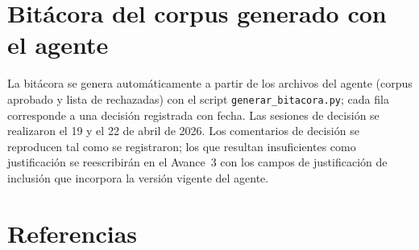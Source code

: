 \documentclass[letter,12pt]{article}
\begin{document}
\section{Bitácora del corpus generado con el agente}\label{anx:bitacora}

La bitácora se genera automáticamente a partir de los archivos del agente (corpus aprobado y lista de rechazadas) con el script \texttt{generar\_bitacora.py}; cada fila corresponde a una decisión registrada con fecha. Las sesiones de decisión se realizaron el 19 y el 22 de abril de 2026. Los comentarios de decisión se reproducen tal como se registraron; los que resultan insuficientes como justificación se reescribirán en el Avance~3 con los campos de justificación de inclusión que incorpora la versión vigente del agente.



\clearpage
\renewcommand{\thesection}{\arabic{section}}
\section*{Referencias}
\renewcommand{\refname}{}
\vspace{-2.5\baselineskip}


\end{document}
